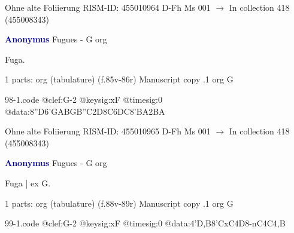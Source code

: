 \documentclass[twocolumn]{book}
\begin{document}
\newline Ohne alte Foliierung
\newline RISM-ID: 455010964
\newline D-Fh  Ms 001
\newline $\rightarrow$ In collection 418 (455008343)
      
\newline \par \vspace{7pt} \textcolor{darkblue}{\textbf{Anonymus  }}
\newline Fugues - G
\newline org
\newline \begin{itshape}[f.86r, at left:] Fuga.\end{itshape} 
\newline \textcolor{darkblue}{}  1 parts: org (tabulature)  (f.85v-86r)
\newline Manuscript copy
.1  org  G  
\begin{filecontents*}{98-1.code}
@clef:G-2
@keysig:xF
@timesig:0
@data:{8''D6'GA}{BGB''C}2D{8C6DC}{8'BA}2BA
\end{filecontents*}
\newline
%

\newline Ohne alte Foliierung
\newline RISM-ID: 455010965
\newline D-Fh  Ms 001
\newline $\rightarrow$ In collection 418 (455008343)
      
\newline \par \vspace{7pt} \textcolor{darkblue}{\textbf{Anonymus  }}
\newline Fugues - G
\newline org
\newline \begin{itshape}[f.88v, at left:] Fuga | ex G.\end{itshape} 
\newline \textcolor{darkblue}{}  1 parts: org (tabulature)  (f.88v-89r)
\newline Manuscript copy
.1  org  G  
\begin{filecontents*}{99-1.code}
@clef:G-2
@keysig:xF
@timesig:0
@data:4'D,B{8'CxC}4D8-nC4C4,B
\end{filecontents*}
\newline
%
\end{document}
